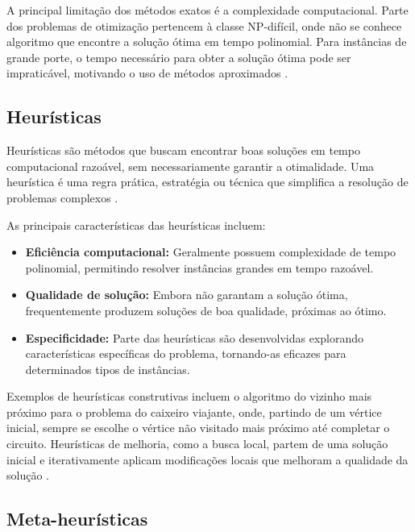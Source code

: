 A principal limitação dos métodos exatos é a complexidade computacional. Parte dos problemas 
de otimização pertencem à classe NP-difícil, onde não se conhece algoritmo que encontre a 
solução ótima em tempo polinomial. Para instâncias de grande porte, o tempo necessário para 
obter a solução ótima pode ser impraticável, motivando o uso de métodos aproximados 
\cite{CORMEN2012}.

\subsection{Heurísticas}

Heurísticas são métodos que buscam encontrar boas soluções em tempo computacional 
razoável, sem necessariamente garantir a otimalidade. Uma heurística é uma regra prática, 
estratégia ou técnica que simplifica a resolução de problemas complexos \cite{RUSSELL2013}.

As principais características das heurísticas incluem:

\begin{itemize}
    \item \textbf{Eficiência computacional:} Geralmente possuem complexidade de tempo 
    polinomial, permitindo resolver instâncias grandes em tempo razoável.
    
    \item \textbf{Qualidade de solução:} Embora não garantam a solução ótima, frequentemente 
    produzem soluções de boa qualidade, próximas ao ótimo.
    
    \item \textbf{Especificidade:} Parte das heurísticas são desenvolvidas explorando características 
    específicas do problema, tornando-as eficazes para determinados tipos de instâncias.
\end{itemize}

Exemplos de heurísticas construtivas incluem o algoritmo do vizinho mais próximo para o 
problema do caixeiro viajante, onde, partindo de um vértice inicial, sempre se escolhe o vértice 
não visitado mais próximo até completar o circuito. Heurísticas de melhoria, como a busca 
local, partem de uma solução inicial e iterativamente aplicam modificações locais que melhoram 
a qualidade da solução \cite{CORMEN2012}.

\subsection{Meta-heurísticas}

